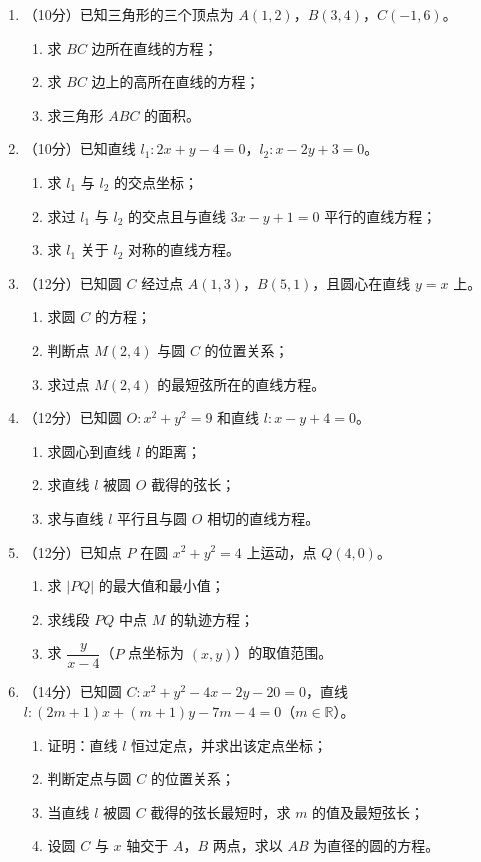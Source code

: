 \documentclass[12pt, a4paper]{ctexart}
\begin{document}
\begin{enumerate}[resume]
\item （10分）已知三角形的三个顶点为 $A(1,2)$，$B(3,4)$，$C(-1,6)$。
\begin{enumerate}[label=(\arabic*)]
\item 求 $BC$ 边所在直线的方程；
\item 求 $BC$ 边上的高所在直线的方程；
\item 求三角形 $ABC$ 的面积。
\end{enumerate}

\item （10分）已知直线 $l_1: 2x+y-4=0$，$l_2: x-2y+3=0$。
\begin{enumerate}[label=(\arabic*)]
\item 求 $l_1$ 与 $l_2$ 的交点坐标；
\item 求过 $l_1$ 与 $l_2$ 的交点且与直线 $3x-y+1=0$ 平行的直线方程；
\item 求 $l_1$ 关于 $l_2$ 对称的直线方程。
\end{enumerate}

\item （12分）已知圆 $C$ 经过点 $A(1,3)$，$B(5,1)$，且圆心在直线 $y=x$ 上。
\begin{enumerate}[label=(\arabic*)]
\item 求圆 $C$ 的方程；
\item 判断点 $M(2,4)$ 与圆 $C$ 的位置关系；
\item 求过点 $M(2,4)$ 的最短弦所在的直线方程。
\end{enumerate}

\item （12分）已知圆 $O: x^2+y^2=9$ 和直线 $l: x-y+4=0$。
\begin{enumerate}[label=(\arabic*)]
\item 求圆心到直线 $l$ 的距离；
\item 求直线 $l$ 被圆 $O$ 截得的弦长；
\item 求与直线 $l$ 平行且与圆 $O$ 相切的直线方程。
\end{enumerate}

\item （12分）已知点 $P$ 在圆 $x^2+y^2=4$ 上运动，点 $Q(4,0)$。
\begin{enumerate}[label=(\arabic*)]
\item 求 $|PQ|$ 的最大值和最小值；
\item 求线段 $PQ$ 中点 $M$ 的轨迹方程；
\item 求 $\dfrac{y}{x-4}$（$P$ 点坐标为 $(x,y)$）的取值范围。
\end{enumerate}

\item （14分）已知圆 $C: x^2+y^2-4x-2y-20=0$，直线 $l: (2m+1)x+(m+1)y-7m-4=0$（$m\in\mathbb{R}$）。
\begin{enumerate}[label=(\arabic*)]
\item 证明：直线 $l$ 恒过定点，并求出该定点坐标；
\item 判断定点与圆 $C$ 的位置关系；
\item 当直线 $l$ 被圆 $C$ 截得的弦长最短时，求 $m$ 的值及最短弦长；
\item 设圆 $C$ 与 $x$ 轴交于 $A$，$B$ 两点，求以 $AB$ 为直径的圆的方程。
\end{enumerate}
\end{enumerate}
\end{document}
